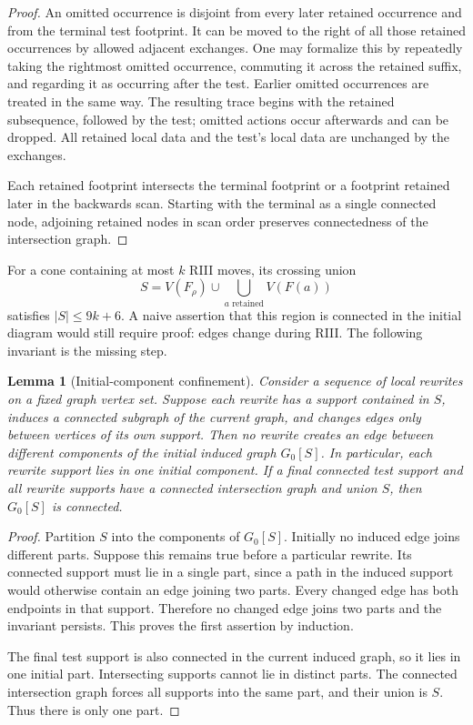 \documentclass[11pt]{article}
\newtheorem{lemma}[theorem]{Lemma}
\theoremstyle{definition}
\begin{document}
\begin{proof}
An omitted occurrence is disjoint from every later retained occurrence
and from the terminal test footprint. It can be moved to the right of
all those retained occurrences by allowed adjacent exchanges. One may
formalize this by repeatedly taking the rightmost omitted occurrence,
commuting it across the retained suffix, and regarding it as occurring
after the test. Earlier omitted occurrences are treated in the same way.
The resulting trace begins with the retained subsequence, followed by the
test; omitted actions occur afterwards and can be dropped. All retained
local data and the test's local data are unchanged by the exchanges.

Each retained footprint intersects the terminal footprint or a footprint
retained later in the backwards scan. Starting with the terminal as a
single connected node, adjoining retained nodes in scan order preserves
connectedness of the intersection graph.
\end{proof}

For a cone containing at most $k$ RIII moves, its crossing union
\begin{equation}
 S=V(F_\rho)\cup\bigcup_{a\text{ retained}}V(F(a))
 \label{eq:region}
\end{equation}
satisfies $|S|\le9k+6$. A naive assertion that this region is connected in
the initial diagram would still require proof: edges change during RIII.
The following invariant is the missing step.

\begin{lemma}[Initial-component confinement]
\label{lem:initialconnect}
Consider a sequence of local rewrites on a fixed graph vertex set. Suppose
each rewrite has a support contained in $S$, induces a connected subgraph
of the current graph, and changes edges only between vertices of its own
support. Then no rewrite creates an edge between different components
of the \emph{initial induced graph} $G_0[S]$. In particular, each rewrite
support lies in one initial component. If a final connected test support
and all rewrite supports have a connected intersection graph and union
$S$, then $G_0[S]$ is connected.
\end{lemma}

\begin{proof}
Partition $S$ into the components of $G_0[S]$. Initially no induced edge
joins different parts. Suppose this remains true before a particular
rewrite. Its connected support must lie in a single part, since a path
in the induced support would otherwise contain an edge joining two
parts. Every changed edge has both endpoints in that support. Therefore
no changed edge joins two parts and the invariant persists. This proves
the first assertion by induction.

The final test support is also connected in the current induced graph,
so it lies in one initial part. Intersecting supports cannot lie in
distinct parts. The connected intersection graph forces all supports
into the same part, and their union is $S$. Thus there is only one part.
\end{proof}
\end{document}
